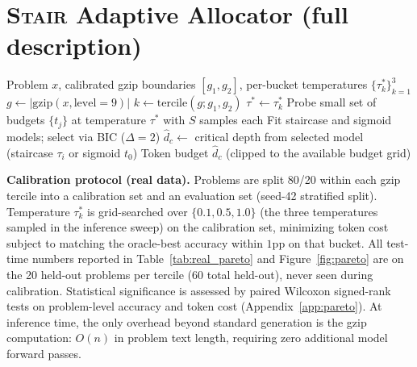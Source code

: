 \documentclass{article}
\newcommand{\method}{\textsc{Stair}}
\begin{document}



\appendix

\section{\method{} Adaptive Allocator (full description)}
\label{app:allocator}


\begin{algorithm}[t]
\caption{\method{} Adaptive Inference Budget Allocation}
\label{alg:stair}
\begin{algorithmic}[1]
\REQUIRE Problem $x$, calibrated gzip boundaries $[g_1, g_2]$, per-bucket temperatures $\{\tau^*_k\}_{k=1}^{3}$
\STATE $g \leftarrow |\text{gzip}(x, \text{level}{=}9)|$ 
\STATE $k \leftarrow \text{tercile}(g; g_1, g_2)$ 
\STATE $\tau^* \leftarrow \tau^*_k$ 
\STATE Probe small set of budgets $\{t_j\}$ at temperature $\tau^*$ with $S$ samples each
\STATE Fit staircase and sigmoid models; select via BIC ($\Delta{=}2$)
\STATE $\hat{d}_c \leftarrow$ critical depth from selected model (staircase $\tau_i$ or sigmoid $t_0$)
\RETURN Token budget $\hat{d}_c$ (clipped to the available budget grid)
\end{algorithmic}
\end{algorithm}

\textbf{Calibration protocol (real data).}  Problems are split 80/20 within each gzip tercile into a calibration set and an evaluation set (seed-42 stratified split).  Temperature $\tau^*_k$ is grid-searched over $\{0.1, 0.5, 1.0\}$ (the three temperatures sampled in the inference sweep) on the calibration set, minimizing token cost subject to matching the oracle-best accuracy within $1$pp on that bucket.  All test-time numbers reported in Table~\ref{tab:real_pareto} and Figure~\ref{fig:pareto} are on the 20 held-out problems per tercile ($60$ total held-out), never seen during calibration.  Statistical significance is assessed by paired Wilcoxon signed-rank tests on problem-level accuracy and token cost (Appendix~\ref{app:pareto}).  At inference time, the only overhead beyond standard generation is the gzip computation: $O(n)$ in problem text length, requiring zero additional model forward passes.
\end{document}
